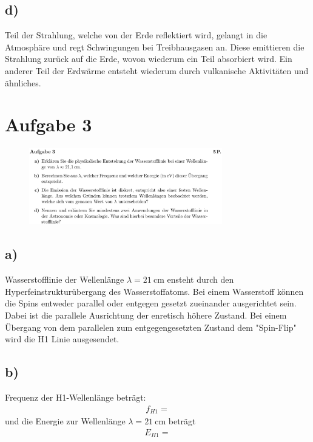 \subsection{d)}

\justifying Teil der Strahlung, welche von der Erde reflektiert wird, gelangt in die Atmosphäre und
regt Schwingungen bei Treibhausgasen an. Diese emittieren die Strahlung zurück auf die Erde,
wovon wiederum ein Teil absorbiert wird.
Ein anderer Teil der Erdwärme entsteht wiederum durch vulkanische Aktivitäten und ähnliches.

\section{Aufgabe 3}

\begin{figure}[H]
    \centering
    \includegraphics[width=0.75\textwidth]{images/Aufgabe_3.jpg}
    \label{fig:3}
\end{figure}

\subsection{a)}

\justifying Wasserstofflinie der Wellenlänge $\lambda = \SI{21}{\centi\meter} $ ensteht durch den
Hyperfeinstrukturübergang des Wasserstoffatoms. Bei einem Wasserstoff können
die Spins entweder parallel oder entgegen gesetzt zueinander ausgerichtet sein.
Dabei ist die parallele Ausrichtung der enretisch höhere Zustand. Bei einem
Übergang von dem parallelen zum entgegengesetzten Zustand dem "Spin-Flip" wird
die H1 Linie ausgesendet.


\subsection{b)}

\justifying Frequenz der H1-Wellenlänge beträgt:
\begin{align*}
    f_{H1}=\text{}
\end{align*}
und die Energie zur Wellenlänge $\lambda = \SI{21}{\centi\meter} $ beträgt
\begin{align}
    E_{H1}=\text{}
\end{align}



